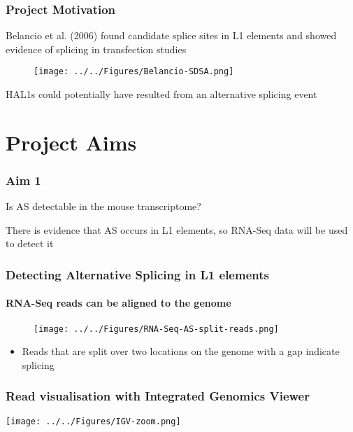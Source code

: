 \documentclass{beamer}
\begin{document}
		\begin{frame} %
			\frametitle{Project Motivation}
			
			
			Belancio et al. (2006) found candidate splice sites in L1 elements and showed evidence of splicing in transfection studies
			\begin{figure}
				\centering
			\texttt{[image: ../../Figures/Belancio-SDSA.png]}
			\end{figure}
			HAL1s could potentially have resulted from an alternative splicing event
			
		\end{frame}
				
		\section{Project Aims}

		\begin{frame} %
			\frametitle{Aim 1}
			\begin{block}{Is AS detectable in the mouse transcriptome?}
				
		
				There is evidence that AS occurs in L1 elements, so RNA-Seq data will be used to detect it
				\end{block}
				
		\end{frame}
		

			\begin{frame} %
				\frametitle{Detecting Alternative Splicing in L1 elements}
				\framesubtitle{RNA-Seq reads can be aligned to the genome}
				
				\vfill
				\begin{figure}
					\centering
					\texttt{[image: ../../Figures/RNA-Seq-AS-split-reads.png]}
				\end{figure}
				\vfill
				\begin{itemize}
					\item Reads that are split over two locations on the genome with a gap indicate splicing
				\end{itemize}
			\end{frame}
				
		\begin{frame} %
			\frametitle{Read visualisation with Integrated Genomics Viewer} 
			\texttt{[image: ../../Figures/IGV-zoom.png]}
		\end{frame}
		
\end{document}
